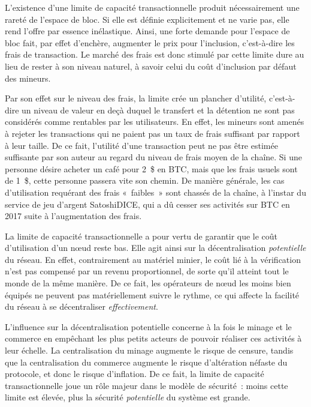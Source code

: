 L'existence d'une limite de capacité transactionnelle produit nécessairement une rareté de l'espace de bloc. Si elle est définie explicitement et ne varie pas, elle rend l'offre par essence inélastique. Ainsi, une forte demande pour l'espace de bloc fait, par effet d'enchère, augmenter le prix pour l'inclusion, c'est-à-dire les frais de transaction. Le marché des frais est donc stimulé par cette limite dure au lieu de rester à son niveau naturel, à savoir celui du coût d'inclusion par défaut des mineurs.

Par son effet sur le niveau des frais, la limite crée un plancher d'utilité, c'est-à-dire un niveau de valeur en deçà duquel le transfert et la détention ne sont pas considérés comme rentables par les utilisateurs. En effet, les mineurs sont amenés à rejeter les transactions qui ne paient pas un taux de frais suffisant par rapport à leur taille. De ce fait, l'utilité d'une transaction peut ne pas être estimée suffisante par son auteur au regard du niveau de frais moyen de la chaîne. Si une personne désire acheter un café pour 2~\$ en BTC, mais que les frais usuels sont de 1~\$, cette personne passera vite son chemin. De manière générale, les cas d'utilisation requérant des frais «~faibles~» sont chassés de la chaîne, à l'instar du service de jeu d'argent SatoshiDICE, qui a dû cesser ses activités sur BTC en 2017 suite à l'augmentation des frais.

La limite de capacité transactionnelle a pour vertu de garantir que le coût d'utilisation d'un nœud reste bas. Elle agit ainsi sur la décentralisation \emph{potentielle} du réseau. En effet, contrairement au matériel minier, le coût lié à la vérification n'est pas compensé par un revenu proportionnel, de sorte qu'il atteint tout le monde de la même manière. De ce fait, les opérateurs de nœud les moins bien équipés ne peuvent pas matériellement suivre le rythme, ce qui affecte la facilité du réseau à se décentraliser \emph{effectivement}. %

L'influence sur la décentralisation potentielle concerne à la fois le minage et le commerce en empêchant les plus petits acteurs de pouvoir réaliser ces activités à leur échelle. La centralisation du minage augmente le risque de censure, tandis que la centralisation du commerce augmente le risque d'altération néfaste du protocole, et donc le risque d'inflation. De ce fait, la limite de capacité transactionnelle joue un rôle majeur dans le modèle de sécurité~: moins cette limite est élevée, plus la sécurité \emph{potentielle} du système est grande.

